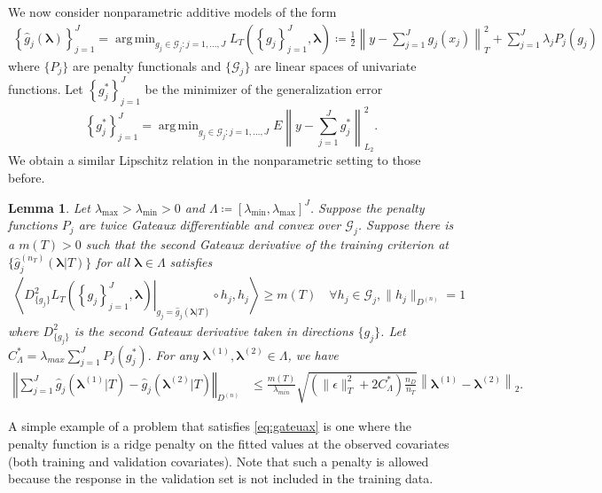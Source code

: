 \documentclass[12pt]{article} %
\newtheorem{lemma}{Lemma}
\theoremstyle{definition}
\DeclareMathOperator*{\argmin}{arg\,min}
\begin{document}
We now consider nonparametric additive models of the form
\begin{align}
\label{eq:train_crit_nonparam}
\left\{ \hat{g}_j( \boldsymbol \lambda) \right \}_{j=1}^J
=
\argmin_{g_j\in \mathcal{G}_j: j=1,...,J}  L_T\left (\left \{ g_j \right \}_{j=1}^J, \boldsymbol{\lambda} \right )
\coloneqq
\frac{1}{2} \left \| y -  \sum_{j=1}^J g_j(x_j) \right \|^2_T 
+ \sum_{j=1}^J \lambda_j P_j(g_j)
\end{align}
where $\{P_j\}$ are penalty functionals and $\{\mathcal{G}_j\}$ are linear spaces of univariate functions.
Let $\left\{ g_j^* \right \}_{j=1}^J$ be the minimizer of the generalization error
\begin{equation}
\left\{ g_j^* \right \}_{j=1}^J = \argmin_{g_j \in \mathcal{G}_j: j=1,...,J}
E \left \| y - \sum_{j=1}^J g_j^* \right \|^2_{L_2}.
\end{equation}
We obtain a similar Lipschitz relation in the nonparametric setting to those before.
\begin{lemma}
	\label{lemma:nonparam_smooth}
	Let $\lambda_{\max} > \lambda_{\min} > 0 $ and $\Lambda \coloneqq [\lambda_{\min}, \lambda_{\max}]^J$.
	Suppose the penalty functions $P_{j}$ are twice Gateaux differentiable and convex over $\mathcal{G}_j$.
	Suppose there is a $m(T) > 0$ such that the second Gateaux derivative of the training criterion at $\{\hat{g}^{(n_T)}_j( \boldsymbol{\lambda} | T)\}$ for all $\boldsymbol{\lambda} \in \Lambda$ satisfies
	\begin{align}
	\left \langle 
	\left . D^2_{\{g_j\}} L_T \left ( \left \{ g_j \right \}_{j=1}^J, \boldsymbol{\lambda} \right ) \right |_{g_j= \hat{g}_j( \boldsymbol{\lambda} | T) }
	\circ h_j, h_j
	\right \rangle 
	\ge m(T)
	\quad \forall h_j \in \mathcal{G}_j,  \|h_j \|_{D^{(n)}} = 1
	\label{eq:gateuax}
	\end{align}
	where $D^2_{\{g_j\}}$ is the second Gateaux derivative taken in directions $\{g_j\}$.
	Let $
	C_{\Lambda}^*= \lambda_{max}\sum_{j=1}^{J} P_{j}(g^*_j).
	$
	For any $\boldsymbol{\lambda}^{(1)}, \boldsymbol{\lambda}^{(2)} \in \Lambda$, we have
	\begin{align}
	\label{eq:nonparam_lipshitz_thrm}
	\left\Vert 
	\sum_{j=1}^J \hat{g}_j\left(\boldsymbol{\lambda}^{(1)} |T \right)-\hat{g}_j\left(\boldsymbol{\lambda}^{(2)} |T \right)\right\Vert _{D^{(n)}} & \le
	\frac{m(T)}{\lambda_{min}}
	\sqrt{
		\left(
		\|\epsilon\|_T^2 + 2 C^*_\Lambda
		\right)
		\frac{n_{D}}{n_{T}}
	}
	\left \|\boldsymbol{\lambda}^{(1)}-\boldsymbol{\lambda}^{(2)} \right \|_2.
	\end{align}
\end{lemma}
\noindent
A simple example of a problem that satisfies \eqref{eq:gateuax} is one where the penalty function is a ridge penalty on the fitted values at the observed covariates (both training and validation covariates).
Note that such a penalty is allowed because the response in the validation set is not included in the training data.
\end{document}
